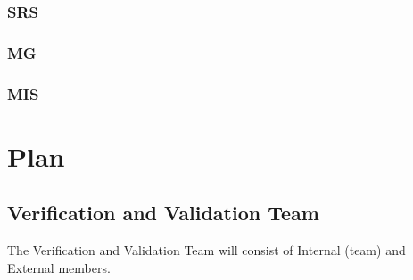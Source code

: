 \documentclass[12pt, titlepage]{article}
\begin{document}
\subsubsection{SRS}
\citet{SRS}

\subsubsection{MG}
\citet{MG}

\subsubsection{MIS}
\citet{MIS}

\section{Plan}


\subsection{Verification and Validation Team}
The Verification and Validation Team will consist of Internal (team) and External members.
\end{document}
